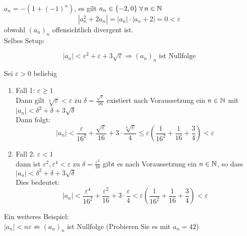 \documentclass[../ana1u.tex]{subfiles}
\begin{document}
\begin{bsp}
    \(a_n = -(1 + (-1)^n)\), es gilt \(a_n \in \{-2, 0\} \; \forall \, n \in \mathbb{N}\)
    \[|a_n^2 + 2a_n| = |a_n| \cdot |a_n + 2| = 0 < \varepsilon\]
    obwohl \((a_n)_n\) offensichtlich divergent ist.\\
    Selbes Setup:
    \begin{beh}
        \[|a_n| < \varepsilon^2 + \varepsilon + 3\sqrt{\varepsilon} \Rightarrow (a_n)_n \text{ ist Nullfolge}\]
    \end{beh}
    \begin{bew}
        Sei \(\varepsilon > 0\) beliebig
        \begin{enumerate}
            \item Fall 1: \(\varepsilon \geq 1\)\\
                Dann gilt \(\sqrt[k]{\varepsilon} < \varepsilon\) zu \(\delta = \frac{\sqrt{\varepsilon}}{16}\) existiert nach Voraussetzung ein \(n \in \mathbb{N}\) mit \(|a_n| < \delta^2 + \delta + 3\sqrt{\delta}\)\\
                Dann folgt:
                \[|a_n| < \frac{\varepsilon}{16^2} + \frac{\sqrt{\varepsilon}}{16} + 3 \cdot \frac{\sqrt[4]{\varepsilon}}{4} \leq \varepsilon\left(\frac{1}{16^2} + \frac{1}{16} + \frac{3}{4}\right) < \varepsilon\]
            \item Fall 2: \(\varepsilon < 1\)\\
                dann ist \(\varepsilon^2, \varepsilon^4 < \varepsilon\) zu \(\delta = \frac{\varepsilon^2}{16}\) gibt es nach Voraussetzung ein \(n \in \mathbb{N}\), so dass \(|a_n| < \delta^2 + \delta + 3\sqrt{\delta}\)\\
                Dies bedeutet:
                \[|a_n| < \frac{\varepsilon^4}{16^2} + \frac{\varepsilon^2}{16} + 3 \cdot \frac{\varepsilon}{4} < \varepsilon\left(\frac{1}{16^2} + \frac{1}{16} + \frac{3}{4}\right) < \varepsilon\]
        \end{enumerate}
    \end{bew}
    Ein weiteres Beispiel:\\
    \(|a_n| < n\varepsilon \not \Rightarrow (a_n)_n\) ist Nullfolge (Probieren Sie es mit \(a_n = 42\))
\end{bsp}
\end{document}
